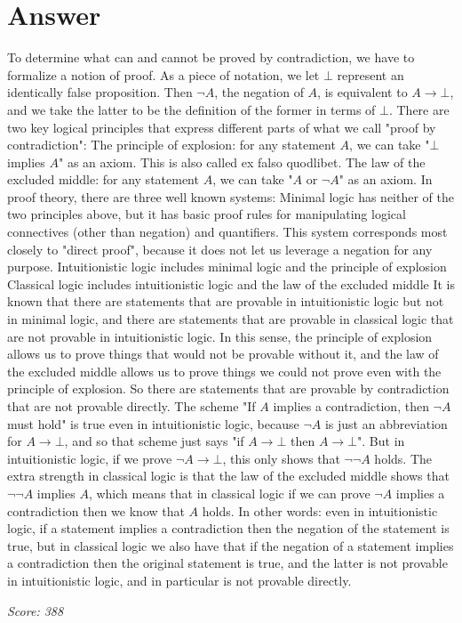 \documentclass{article}
\begin{document}
\section*{Answer}
To determine what can and cannot be proved by contradiction, we have to formalize a notion of proof. As a piece of notation, we let $\bot$ represent an identically false proposition. Then $\lnot A$, the negation of $A$, is equivalent to $A \to \bot$, and we take the latter to be the definition of the former in terms of $\bot$. There are two key logical principles that express different parts of what we call "proof by contradiction": The principle of explosion: for any statement $A$, we can take "$\bot$ implies $A$" as an axiom. This is also called ex falso quodlibet. The law of the excluded middle: for any statement $A$, we can take "$A$ or $\lnot A$" as an axiom. In proof theory, there are three well known systems: Minimal logic has neither of the two principles above, but it has basic proof rules for manipulating logical connectives (other than negation) and quantifiers. This system corresponds most closely to "direct proof", because it does not let us leverage a negation for any purpose. Intuitionistic logic includes minimal logic and the principle of explosion Classical logic includes intuitionistic logic and the law of the excluded middle It is known that there are statements that are provable in intuitionistic logic but not in minimal logic, and there are statements that are provable in classical logic that are not provable in intuitionistic logic. In this sense, the principle of explosion allows us to prove things that would not be provable without it, and the law of the excluded middle allows us to prove things we could not prove even with the principle of explosion. So there are statements that are provable by contradiction that are not provable directly. The scheme "If $A$ implies a contradiction, then $\lnot A$ must hold" is true even in intuitionistic logic, because $\lnot A$ is just an abbreviation for $A \to \bot$, and so that scheme just says "if $A \to \bot$ then $A \to \bot$". But in intuitionistic logic, if we prove $\lnot A \to \bot$, this only shows that $\lnot \lnot A$ holds. The extra strength in classical logic is that the law of the excluded middle shows that $\lnot \lnot A$ implies $A$, which means that in classical logic if we can prove $\lnot A$ implies a contradiction then we know that $A$ holds. In other words: even in intuitionistic logic, if a statement implies a contradiction then the negation of the statement is true, but in classical logic we also have that if the negation of a statement implies a contradiction then the original statement is true, and the latter is not provable in intuitionistic logic, and in particular is not provable directly.

\vspace{1em}
\noindent\textit{Score: 388}
\end{document}
